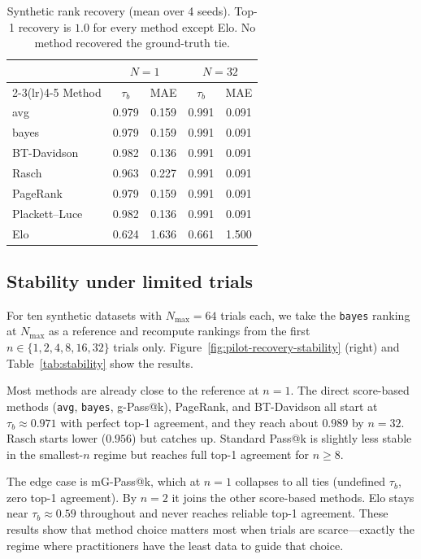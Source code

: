 \documentclass{juliacon}
\begin{document}
\begin{table}[t]
\centering
\caption{Synthetic rank recovery (mean over 4 seeds). Top-1 recovery is \(1.0\) for every method except Elo. No method recovered the ground-truth tie.}
\label{tab:recovery}
\footnotesize
\begin{tabular}{lcccc}
\toprule
 & \multicolumn{2}{c}{$N=1$} & \multicolumn{2}{c}{$N=32$} \\
\cmidrule(lr){2-3}\cmidrule(lr){4-5}
Method & $\tau_b$ & MAE & $\tau_b$ & MAE \\
\midrule
avg & 0.979 & 0.159 & 0.991 & 0.091 \\
bayes & 0.979 & 0.159 & 0.991 & 0.091 \\
BT-Davidson & 0.982 & 0.136 & 0.991 & 0.091 \\
Rasch & 0.963 & 0.227 & 0.991 & 0.091 \\
PageRank & 0.979 & 0.159 & 0.991 & 0.091 \\
Plackett--Luce & 0.982 & 0.136 & 0.991 & 0.091 \\
Elo & 0.624 & 1.636 & 0.661 & 1.500 \\
\bottomrule
\end{tabular}
\end{table}

\subsection{Stability under limited trials}

For ten synthetic datasets with \(N_{\max}=64\) trials each, we take the \texttt{bayes} ranking at \(N_{\max}\) as a reference and recompute rankings from the first \(n \in \{1,2,4,8,16,32\}\) trials only. Figure~\ref{fig:pilot-recovery-stability} (right) and Table~\ref{tab:stability} show the results.

Most methods are already close to the reference at \(n=1\). The direct score-based methods (\texttt{avg}, \texttt{bayes}, g-Pass@k), PageRank, and BT-Davidson all start at \(\tau_b \approx 0.971\) with perfect top-1 agreement, and they reach about \(0.989\) by \(n=32\). Rasch starts lower (\(0.956\)) but catches up. Standard Pass@k is slightly less stable in the smallest-\(n\) regime but reaches full top-1 agreement for \(n \ge 8\).

The edge case is mG-Pass@k, which at \(n=1\) collapses to all ties (undefined \(\tau_b\), zero top-1 agreement). By \(n=2\) it joins the other score-based methods. Elo stays near \(\tau_b \approx 0.59\) throughout and never reaches reliable top-1 agreement. These results show that method choice matters most when trials are scarce---exactly the regime where practitioners have the least data to guide that choice.
\end{document}
